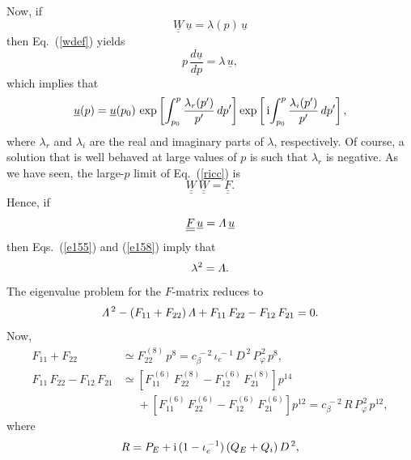 \documentclass[12pt,prb,aps]{revtex4-1}
\providecommand{\DIFadd}[1]{{\protect\color{blue}\uwave{#1}}} %
\providecommand{\DIFaddbegin}{} %
\providecommand{\DIFaddend}{} %
\begin{document}
Now, if
\begin{equation}\label{e155}
\underline{\underline{W}}\,\underline{u}= \lambda(p)\,\underline{u}
\end{equation}
then Eq.~(\ref{wdef}) yields\DIFaddbegin \DIFadd{, 
}\DIFaddend \begin{equation}
p\,\frac{d\underline{u}}{dp} = \lambda\,\underline{u},
\end{equation}
which implies that
\begin{equation}
\underline{u}(p) = \underline{u}(p_0)\,\exp\left[\int_{p_0}^p\frac{\lambda_r(p')}{p'}\,dp'\right]\exp\left[\,{\rm i}\!\int_{p_0}^p\frac{\lambda_i(p')}{p'}\,dp'\right], 
\end{equation}
where $\lambda_r$  and $\lambda_i$ are the real and imaginary parts of $\lambda$, respectively. 
Of course, a solution that is well behaved at large values of $p$ is such that $\lambda_r$ is negative. As we have seen, the large-$p$ limit of
Eq.~(\ref{ricc}) is
\begin{equation}
\underline{\underline{W}}\,\underline{\underline{W}} = \underline{\underline{F}}.
\end{equation}
Hence, if
\begin{equation}\label{e158}
 \underline{\underline{F}}\,\underline{u} = {\mit\Lambda}\,\underline{u}
 \end{equation}
 then Eqs.~(\ref{e155}) and (\ref{e158}) imply that 
 \begin{equation}
 \lambda^2 = {\mit\Lambda}.
 \end{equation}
 The eigenvalue problem for the $F$-matrix reduces to
 \begin{equation}
 {\mit\Lambda}^{\,2}- (F_{11}+ F_{22})\,{\mit\Lambda} + F_{11}\,F_{22} - F_{12}\,F_{21}=0.
 \end{equation}
 Now,
 \begin{align}
 F_{11}+F_{22}&\simeq  F_{22}^{\,(8)}\,p^8 =c_\beta^{\,-2}\, \iota_e^{\,-1}\,D^{\,2}\,P_\varphi^{\,2}\,p^8,\\[0.5ex]
 F_{11}\,F_{22} - F_{12}\,F_{21}&  \simeq \left[F_{11}^{\,(6)}\,F_{22}^{\,(8)} - F_{12}^{\,(6)}\,F_{21}^{\,(8)}\right]p^{14}\nonumber\\[0.5ex]&\phantom{=}+\left[F_{11}^{\,(6)}\,F_{22}^{\,(6)} - F_{12}^{\,(6)}\,F_{21}^{\,(6)}\right]p^{12}
=c_\beta^{\,-2}\,R\,P_\varphi^{\,2}\,p^{12},
 \end{align}
  where 
 \begin{equation}
 R= P_E + {\rm i}\,(1-\iota_e^{\,-1})\,(Q_E+Q_i)\,D^{\,2},
 \end{equation}
\end{document}
